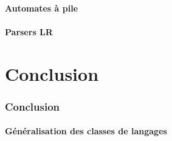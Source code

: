 \documentclass[9pt]{beamer}
\begin{document}
\subsection{Automates à pile}











 
\subsection{Parsers LR}









\part{Conclusion}
 
 
\section{Conclusion}
 
\subsection{Généralisation des classes de langages}




 
\end{document}
